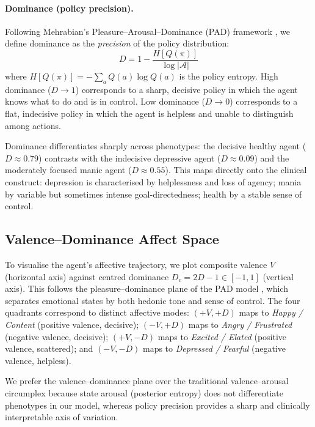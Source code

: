 \documentclass[11pt,a4paper]{article}
\begin{document}
\paragraph{Dominance (policy precision).} Following Mehrabian's Pleasure--Arousal--Dominance (PAD) framework \citep{mehrabian1996pleasure}, we define dominance as the \emph{precision} of the policy distribution:
\begin{equation}
    D = 1 - \frac{H[Q(\pi)]}{\log |\mathcal{A}|}
\end{equation}
where $H[Q(\pi)] = -\sum_a Q(a) \log Q(a)$ is the policy entropy. High dominance ($D \to 1$) corresponds to a sharp, decisive policy in which the agent knows what to do and is in control. Low dominance ($D \to 0$) corresponds to a flat, indecisive policy in which the agent is helpless and unable to distinguish among actions.

Dominance differentiates sharply across phenotypes: the decisive healthy agent ($D \approx 0.79$) contrasts with the indecisive depressive agent ($D \approx 0.09$) and the moderately focused manic agent ($D \approx 0.55$). This maps directly onto the clinical construct: depression is characterised by helplessness and loss of agency; mania by variable but sometimes intense goal-directedness; health by a stable sense of control.

\subsection{Valence--Dominance Affect Space}

To visualise the agent's affective trajectory, we plot composite valence $V$ (horizontal axis) against centred dominance $D_c = 2D - 1 \in [-1, 1]$ (vertical axis). This follows the pleasure--dominance plane of the PAD model \citep{mehrabian1996pleasure}, which separates emotional states by both hedonic tone and sense of control. The four quadrants correspond to distinct affective modes: $(+V, +D)$ maps to \emph{Happy / Content} (positive valence, decisive); $(-V, +D)$ maps to \emph{Angry / Frustrated} (negative valence, decisive); $(+V, -D)$ maps to \emph{Excited / Elated} (positive valence, scattered); and $(-V, -D)$ maps to \emph{Depressed / Fearful} (negative valence, helpless).

We prefer the valence--dominance plane over the traditional valence--arousal circumplex \citep{russell1980circumplex} because state arousal (posterior entropy) does not differentiate phenotypes in our model, whereas policy precision provides a sharp and clinically interpretable axis of variation.
\end{document}
